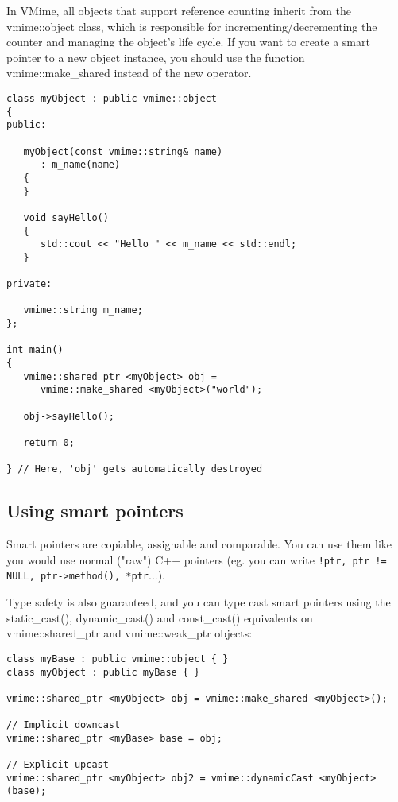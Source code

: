 In VMime, all objects that support reference counting inherit from the
{\vcode vmime::object} class, which is responsible for
incrementing/decrementing the counter and managing the object's life cycle.
If you want to create a smart pointer to a new object instance, you should
use the function {\vcode vmime::make\_shared} instead of the {\vcode new}
operator.

\begin{lstlisting}[caption={Smarts pointers and creating objects}]
class myObject : public vmime::object
{
public:

   myObject(const vmime::string& name)
      : m_name(name)
   {
   }

   void sayHello()
   {
      std::cout << "Hello " << m_name << std::endl;
   }

private:

   vmime::string m_name;
};

int main()
{
   vmime::shared_ptr <myObject> obj =
      vmime::make_shared <myObject>("world");

   obj->sayHello();

   return 0;

} // Here, 'obj' gets automatically destroyed
\end{lstlisting}

\subsection{Using smart pointers} %

Smart pointers are copiable, assignable and comparable. You can use them like
you would use normal ("raw") C++ pointers (eg. you can write
\lstinline{!ptr, ptr != NULL, ptr->method(), *ptr}...).

Type safety is also guaranteed, and you can type cast smart pointers using
the {\vcode static\_cast()}, {\vcode dynamic\_cast()} and {\vcode const\_cast()}
equivalents on {\vcode vmime::shared\_ptr} and {\vcode vmime::weak\_ptr} objects:

\begin{lstlisting}[caption={Casting smart pointers}]
class myBase : public vmime::object { }
class myObject : public myBase { }

vmime::shared_ptr <myObject> obj = vmime::make_shared <myObject>();

// Implicit downcast
vmime::shared_ptr <myBase> base = obj;

// Explicit upcast
vmime::shared_ptr <myObject> obj2 = vmime::dynamicCast <myObject>(base);
\end{lstlisting}

